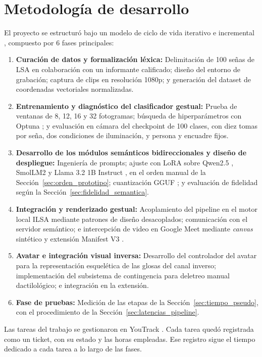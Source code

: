 \section{Metodología de desarrollo}
El proyecto se estructuró bajo un modelo de ciclo de vida iterativo e incremental \parencite{pressman2014software}, compuesto por 6 fases principales:
\begin{enumerate}
    \item \textbf{Curación de datos y formalización léxica:} Delimitación de 100 señas de LSA en colaboración con un informante calificado; diseño del entorno de grabación; captura de clips en resolución 1080p; y generación del dataset de coordenadas vectoriales normalizadas.
    \item \textbf{Entrenamiento y diagnóstico del clasificador gestual:} Prueba de ventanas de 8, 12, 16 y 32 fotogramas; búsqueda de hiperparámetros con Optuna \parencite{akiba2019optuna}; y evaluación en cámara del checkpoint de 100 clases, con diez tomas por seña, dos condiciones de iluminación, y persona y encuadre fijos.
    \item \textbf{Desarrollo de los módulos semánticos bidireccionales y diseño de despliegue:} Ingeniería de prompts; ajuste con LoRA sobre Qwen2.5 \parencite{qwen2024qwen25}, SmolLM2 \parencite{allal2024smollm2} y Llama 3.2 1B Instruct \parencite{meta2024llama321b}, en el orden manual de la Sección~\ref{sec:orden_prototipo}; cuantización GGUF \parencite{gerganov2023llamacpp}; y evaluación de fidelidad según la Sección~\ref{sec:fidelidad_semantica}.
    \item \textbf{Integración y renderizado gestual:} Acoplamiento del pipeline en el motor local ILSA mediante patrones de diseño desacoplados; comunicación con el servidor semántico; e intercepción de video en Google Meet mediante \textit{canvas} sintético y extensión Manifest V3 \parencite{chrome2024manifestv3}.
    \item \textbf{Avatar e integración visual inversa:} Desarrollo del controlador del avatar para la representación esquelética de las glosas del canal inverso; implementación del subsistema de contingencia para deletreo manual dactilológico; e integración en la extensión.
    \item \textbf{Fase de pruebas:} Medición de las etapas de la Sección~\ref{sec:tiempo_pseudo}, con el procedimiento de la Sección~\ref{sec:latencias_pipeline}.
\end{enumerate}

Las tareas del trabajo se gestionaron en YouTrack \cite{jetbrains2024youtrack}. Cada tarea quedó registrada como un ticket, con su estado y las horas empleadas. Ese registro sigue el tiempo dedicado a cada tarea a lo largo de las fases.

